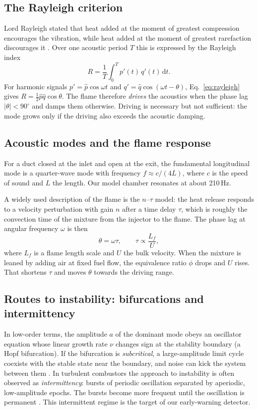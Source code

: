 \documentclass[11pt,a4paper]{article}
\newcommand{\pp}{p'}
\newcommand{\qq}{q'}
\begin{document}
\subsection{The Rayleigh criterion}
Lord Rayleigh stated that heat added at the moment of greatest compression encourages the vibration, while heat added at the moment of greatest rarefaction discourages it \cite{rayleigh1878}. Over one acoustic period $T$ this is expressed by the Rayleigh index
\begin{equation}
  R = \frac{1}{T}\int_0^T \pp(t)\,\qq(t)\,\mathrm{d}t .
  \label{eq:rayleigh}
\end{equation}
For harmonic signals $\pp = \hat p\cos\omega t$ and $\qq = \hat q\cos(\omega t-\theta)$, Eq.~\eqref{eq:rayleigh} gives $R = \tfrac12\hat p\hat q\cos\theta$. The flame therefore \emph{drives} the acoustics when the phase lag $|\theta| < 90^\circ$ and damps them otherwise. Driving is necessary but not sufficient: the mode grows only if the driving also exceeds the acoustic damping.

\subsection{Acoustic modes and the flame response}
For a duct closed at the inlet and open at the exit, the fundamental longitudinal mode is a quarter-wave mode with frequency $f \approx c/(4L)$, where $c$ is the speed of sound and $L$ the length. Our model chamber resonates at about 210\,Hz.

A widely used description of the flame is the $n$--$\tau$ model: the heat release responds to a velocity perturbation with gain $n$ after a time delay $\tau$, which is roughly the convection time of the mixture from the injector to the flame. The phase lag at angular frequency $\omega$ is then
\begin{equation}
  \theta = \omega\tau, \qquad \tau \propto \frac{L_f}{U},
  \label{eq:ntau}
\end{equation}
where $L_f$ is a flame length scale and $U$ the bulk velocity. When the mixture is leaned by adding air at fixed fuel flow, the equivalence ratio $\phi$ drops and $U$ rises. That shortens $\tau$ and moves $\theta$ towards the driving range.

\subsection{Routes to instability: bifurcations and intermittency}
In low-order terms, the amplitude $a$ of the dominant mode obeys an oscillator equation whose linear growth rate $\nu$ changes sign at the stability boundary (a Hopf bifurcation). If the bifurcation is \emph{subcritical}, a large-amplitude limit cycle coexists with the stable state near the boundary, and noise can kick the system between them \cite{noiray2013}. In turbulent combustors the approach to instability is often observed as \emph{intermittency}: bursts of periodic oscillation separated by aperiodic, low-amplitude epochs. The bursts become more frequent until the oscillation is permanent \cite{nair2014}. This intermittent regime is the target of our early-warning detector.
\end{document}
